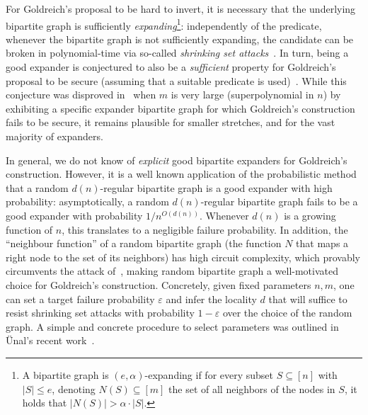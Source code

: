 \documentclass[journal=tosc,submission]{iacrtrans}
\theoremstyle{theorem}
\begin{document}
For Goldreich's proposal to be hard to invert, it is necessary that the underlying bipartite graph is sufficiently \emph{expanding}\footnote{A bipartite graph is $(e,\alpha)$-expanding if for every subset $S\subseteq [n]$ with $|S| \leq e$, denoting $N(S) \subseteq [m]$ the set of all neighbors of the nodes in $S$, it holds that $|N(S)| > \alpha \cdot |S|$.}: independently of the predicate, whenever the bipartite graph is not sufficiently expanding, the candidate can be broken in polynomial-time via so-called \emph{shrinking set attacks}~\cite{applebaum2008pseudorandom,zichron2017locally}. In turn, being a good expander is conjectured to also be a \emph{sufficient} property for Goldreich's proposal to be secure (assuming that a suitable predicate is used)~\cite{TCC:AppRay16b}. While this conjecture was disproved in~\cite{ITCS:OliSanTel19} when $m$ is very large (superpolynomial in $n$) by exhibiting a specific expander bipartite graph for which Goldreich's construction fails to be secure, it remains plausible for smaller stretches, and for the vast majority of expanders.

In general, we do not know of \emph{explicit} good bipartite expanders for Goldreich's construction. However, it is a well known application of the probabilistic method that a random $d(n)$-regular bipartite graph is a good expander with high probability: asymptotically, a random $d(n)$-regular bipartite graph fails to be a good expander with probability $1/n^{O(d(n))}$. Whenever $d(n)$ is a growing function of $n$, this translates to a negligible failure probability. In addition, the ``neighbour function'' of a random bipartite graph (the function $N$ that maps a right node to the set of its neighbors) has high circuit complexity, which provably circumvents the attack of~\cite{ITCS:OliSanTel19}, making random bipartite graph a well-motivated choice for Goldreich's construction. Concretely, given fixed parameters $n,m$, one can set a target failure probability $\varepsilon$ and infer the locality $d$ that will suffice to resist shrinking set attacks with probability $1-\varepsilon$ over the choice of the random graph. A simple and concrete procedure to select parameters was outlined in Ünal's recent work~\cite{EPRINT:Unal23b}.
\end{document}
